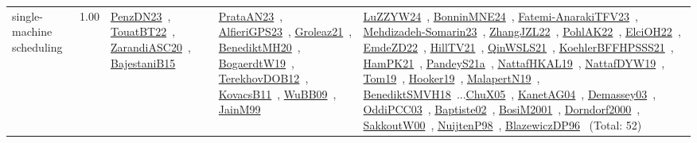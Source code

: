 {\begin{longtable}{p{3cm}r>{\raggedright\arraybackslash}p{6cm}>{\raggedright\arraybackslash}p{6cm}>{\raggedright\arraybackslash}p{8cm}}
\index{single-machine scheduling}\index{Concepts!single-machine scheduling}single-machine scheduling &  1.00 & \href{../works/PenzDN23.pdf}{PenzDN23}~\cite{PenzDN23}, \href{../works/TouatBT22.pdf}{TouatBT22}~\cite{TouatBT22}, \href{../works/ZarandiASC20.pdf}{ZarandiASC20}~\cite{ZarandiASC20}, \href{../works/BajestaniB15.pdf}{BajestaniB15}~\cite{BajestaniB15} & \href{../works/PrataAN23.pdf}{PrataAN23}~\cite{PrataAN23}, \href{../works/AlfieriGPS23.pdf}{AlfieriGPS23}~\cite{AlfieriGPS23}, \href{../works/Groleaz21.pdf}{Groleaz21}~\cite{Groleaz21}, \href{../works/BenediktMH20.pdf}{BenediktMH20}~\cite{BenediktMH20}, \href{../works/BogaerdtW19.pdf}{BogaerdtW19}~\cite{BogaerdtW19}, \href{../works/TerekhovDOB12.pdf}{TerekhovDOB12}~\cite{TerekhovDOB12}, \href{../works/KovacsB11.pdf}{KovacsB11}~\cite{KovacsB11}, \href{../works/WuBB09.pdf}{WuBB09}~\cite{WuBB09}, \href{../works/JainM99.pdf}{JainM99}~\cite{JainM99} & \href{../works/LuZZYW24.pdf}{LuZZYW24}~\cite{LuZZYW24}, \href{../works/BonninMNE24.pdf}{BonninMNE24}~\cite{BonninMNE24}, \href{../works/Fatemi-AnarakiTFV23.pdf}{Fatemi-AnarakiTFV23}~\cite{Fatemi-AnarakiTFV23}, \href{../works/Mehdizadeh-Somarin23.pdf}{Mehdizadeh-Somarin23}~\cite{Mehdizadeh-Somarin23}, \href{../works/ZhangJZL22.pdf}{ZhangJZL22}~\cite{ZhangJZL22}, \href{../works/PohlAK22.pdf}{PohlAK22}~\cite{PohlAK22}, \href{../works/ElciOH22.pdf}{ElciOH22}~\cite{ElciOH22}, \href{../works/EmdeZD22.pdf}{EmdeZD22}~\cite{EmdeZD22}, \href{../works/HillTV21.pdf}{HillTV21}~\cite{HillTV21}, \href{../works/QinWSLS21.pdf}{QinWSLS21}~\cite{QinWSLS21}, \href{../works/KoehlerBFFHPSSS21.pdf}{KoehlerBFFHPSSS21}~\cite{KoehlerBFFHPSSS21}, \href{../works/HamPK21.pdf}{HamPK21}~\cite{HamPK21}, \href{../works/PandeyS21a.pdf}{PandeyS21a}~\cite{PandeyS21a}, \href{../works/NattafHKAL19.pdf}{NattafHKAL19}~\cite{NattafHKAL19}, \href{../works/NattafDYW19.pdf}{NattafDYW19}~\cite{NattafDYW19}, \href{../works/Tom19.pdf}{Tom19}~\cite{Tom19}, \href{../works/Hooker19.pdf}{Hooker19}~\cite{Hooker19}, \href{../works/MalapertN19.pdf}{MalapertN19}~\cite{MalapertN19}, \href{../works/BenediktSMVH18.pdf}{BenediktSMVH18}~\cite{BenediktSMVH18}...\href{../works/ChuX05.pdf}{ChuX05}~\cite{ChuX05}, \href{../works/KanetAG04.pdf}{KanetAG04}~\cite{KanetAG04}, \href{../works/Demassey03.pdf}{Demassey03}~\cite{Demassey03}, \href{../works/OddiPCC03.pdf}{OddiPCC03}~\cite{OddiPCC03}, \href{../works/Baptiste02.pdf}{Baptiste02}~\cite{Baptiste02}, \href{../works/BosiM2001.pdf}{BosiM2001}~\cite{BosiM2001}, \href{../works/Dorndorf2000.pdf}{Dorndorf2000}~\cite{Dorndorf2000}, \href{../works/SakkoutW00.pdf}{SakkoutW00}~\cite{SakkoutW00}, \href{../works/NuijtenP98.pdf}{NuijtenP98}~\cite{NuijtenP98}, \href{../works/BlazewiczDP96.pdf}{BlazewiczDP96}~\cite{BlazewiczDP96} (Total: 52)\\

\end{longtable}}
